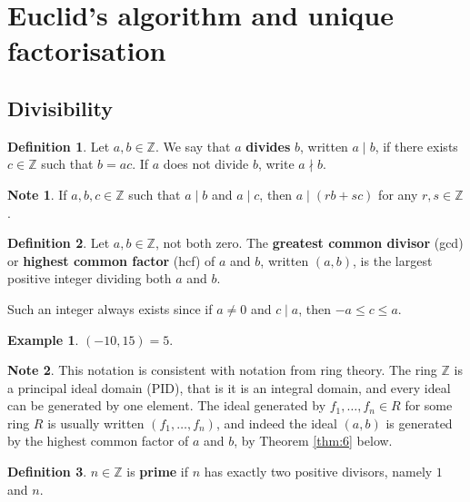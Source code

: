 \documentclass{article}
\newcommand{\Z}{\mathbb{Z}}
\newcommand{\rb}[1]{\left( #1 \right)}
\theoremstyle{definition}\newtheorem{definition}{Definition}
\theoremstyle{definition}\newtheorem*{remark}{Remark}
\theoremstyle{definition}\newtheorem*{example}{Example}
\theoremstyle{definition}\newtheorem*{note}{Note}
\begin{document}
\section{Euclid's algorithm and unique factorisation}

\subsection{Divisibility}

\begin{definition}
Let $ a, b \in \Z $. We say that $ a $ \textbf{divides} $ b $, written $ a \mid b $, if there exists $ c \in \Z $ such that $ b = ac $. If $ a $ does not divide $ b $, write $ a \nmid b $.
\end{definition}

\begin{note}
If $ a, b, c \in \Z $ such that $ a \mid b $ and $ a \mid c $, then $ a \mid \rb{rb + sc} $ for any $ r, s \in \Z $.
\end{note}

\begin{definition}
Let $ a, b \in \Z $, not both zero. The \textbf{greatest common divisor} (gcd) or \textbf{highest common factor} (hcf) of $ a $ and $ b $, written $ \rb{a, b} $, is the largest positive integer dividing both $ a $ and $ b $.
\end{definition}

Such an integer always exists since if $ a \ne 0 $ and $ c \mid a $, then $ -a \le c \le a $.

\begin{example}
$ \rb{-10, 15} = 5 $.
\end{example}

\begin{note}
This notation is consistent with notation from ring theory. The ring $ \Z $ is a principal ideal domain (PID), that is it is an integral domain, and every ideal can be generated by one element. The ideal generated by $ f_1, \dots, f_n \in R $ for some ring $ R $ is usually written $ \rb{f_1, \dots, f_n} $, and indeed the ideal $ \rb{a, b} $ is generated by the highest common factor of $ a $ and $ b $, by Theorem \ref{thm:6} below.
\end{note}

\begin{definition}
$ n \in \Z $ is \textbf{prime} if $ n $ has exactly two positive divisors, namely $ 1 $ and $ n $.
\end{definition}
\end{document}
